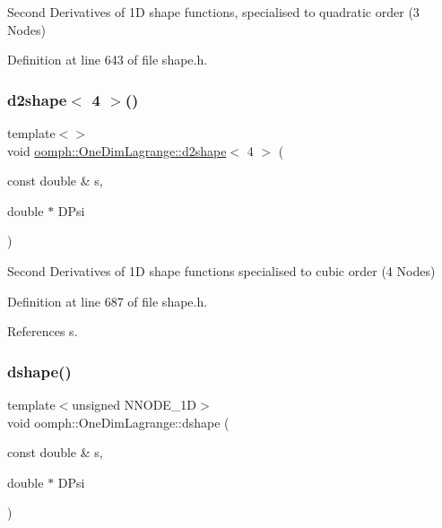 Second Derivatives of 1D shape functions, specialised to quadratic order (3 Nodes) 

Definition at line 643 of file shape.\+h.

\mbox{\label{namespaceoomph_1_1OneDimLagrange_aa79886f1732f57679a30e9632c50a09a}} 
\subsubsection{\texorpdfstring{d2shape$<$ 4 $>$()}{d2shape< 4 >()}}
{\footnotesize\ttfamily template$<$$>$ \\
void \hyperlink{namespaceoomph_1_1OneDimLagrange_a9515ce1aa8ef987244c379655c41fa01}{oomph\+::\+One\+Dim\+Lagrange\+::d2shape}$<$ 4 $>$ (\begin{DoxyParamCaption}\item[{const double \&}]{s,  }\item[{double $\ast$}]{D\+Psi }\end{DoxyParamCaption})\hspace{0.3cm}{\ttfamily [inline]}}

Second Derivatives of 1D shape functions specialised to cubic order (4 Nodes) 

Definition at line 687 of file shape.\+h.



References s.

\mbox{\label{namespaceoomph_1_1OneDimLagrange_af66e48b956c460371ac77032c1efcd72}} 
\subsubsection{\texorpdfstring{dshape()}{dshape()}}
{\footnotesize\ttfamily template$<$unsigned N\+N\+O\+D\+E\+\_\+1D$>$ \\
void oomph\+::\+One\+Dim\+Lagrange\+::dshape (\begin{DoxyParamCaption}\item[{const double \&}]{s,  }\item[{double $\ast$}]{D\+Psi }\end{DoxyParamCaption})}



